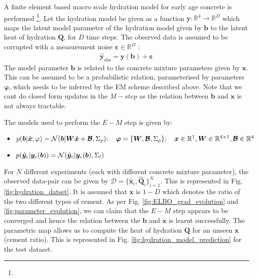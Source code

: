 \documentclass[a4paper,11pt]{article}
\begin{document}
A finite element based macro scale hydration model for early age concrete is performed \footnote{}. Let the hydration model be given as a function $\bm{y} : \mathbb{R}^4 \rightarrow \mathbb{R}^D$ which maps the latent model parameter of the hydration model given by $\bm b$ to the latent heat of hydration $\bm Q$, for $D$ time steps. The observed data is assumed to be corrupted  with a measurement noise $\boldsymbol{\varepsilon} \in \mathbb{R}^{D}$ :
\begin{align}
	\hat{\bm y}_{\text{obs}} = \bm{y}(\bm b) + \bm{\varepsilon}
\end{align}
The model parameter $\bm{b}$ is related to the concrete mixture parameters given by $\bm{x}$. This can be assumed to be a probabilistic relation, parameterised by parameters $\bm \varphi$, which needs to be inferred by the EM scheme described above. Note that we cant do closed form updates in the $M-step$ as the relation between $\bm{b}$ and $\bm{x}$ is not always tractable.

The models used to perform the $E-M$ step is given by:
\begin{itemize}
    \item $p(\boldsymbol{b} | \hat{\bm x}; \varphi) = \mathcal{N}(\boldsymbol{b}| \bm {W} \hat{\bm x}+ \bm{\mathcal{B}}, \Sigma_p); \quad \bm \varphi = \{ \bm{W},\bm{\mathcal{B}},\Sigma_p \};~~~\bm x \in \mathbb{R}^1, \bm{W} \in \mathbb{R}^{4\times 1},\bm{\mathcal{B}} \in \mathbb{R}^{4} $
    \item $p(\hat{\boldsymbol{y}}_c | \boldsymbol{y}_c(\boldsymbol{b})) = \mathcal{N}(\hat{\boldsymbol{y}}_c|\bm{y}_c(\bm b),\Sigma_l)$
\end{itemize}

For $N$ different experiments (each with different concrete mixture parameter), the observed data-pair can be given by $\mathcal{D} = \{\bm{\hat{x}}_{i},\bm{\hat{Q}}_{i}\}_{i=1}^{N}$. This is represented in Fig.\ref{fig:hydration_datset}. It is assumed that $\bm x$ is $1-D$ which denotes the ratio of the two different types of cement. As per Fig. \ref{fig:ELBO_grad_evolution} and \ref{fig:parameter_evolution}, we can claim that the $E-M$ step appears to be converged and hence the relation between the $\bm{b}$ and $\bm{x}$ is learnt successfully. The parametric map allows us to compute the heat of hydration $\bm Q$ for an unseen $\bm x$ (cement ratio). This is represented in Fig. \ref{fig:hydration_model_prediction} for the test dataset. 
\end{document}
